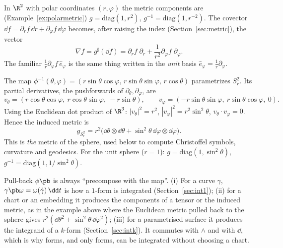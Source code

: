 \begin{example}
In $\R^2$ with polar coordinates $(r,\varphi)$ the metric components are (Example~\ref{ex:polarmetric}) $g=\mathrm{diag}(1,r^2)$, $g^{-1}=\mathrm{diag}(1,r^{-2})$. The covector $\dd f=\partial_rf\,\dd r+\partial_\varphi f\,\dd\varphi$ becomes, after raising the index (Section~\ref{sec:metric}), the vector
\[
\nabla f=g^\sharp(\dd f)=\partial_rf\;\partial_r+\frac{1}{r^2}\partial_\varphi f\;\partial_\varphi .
\]
The familiar $\frac1r\partial_\varphi f\,\hat e_\varphi$ is the same thing written in the \emph{unit} basis $\hat e_\varphi=\frac1r\partial_\varphi$.
\end{example}

\begin{example}
The map $\phi^{-1}(\theta,\varphi)=(r\sin\theta\cos\varphi,\,r\sin\theta\sin\varphi,\,r\cos\theta)$ parametrizes $S^2_r$. Its partial derivatives, \ie the pushforwards of $\partial_\theta,\partial_\varphi$, are
\[
v_\theta=(r\cos\theta\cos\varphi,\ r\cos\theta\sin\varphi,\ -r\sin\theta),\qquad
v_\varphi=(-r\sin\theta\sin\varphi,\ r\sin\theta\cos\varphi,\ 0).
\]
Using the Euclidean dot product of $\R^3$: $|v_\theta|^2=r^2$, $|v_\varphi|^2=r^2\sin^2\theta$, $v_\theta\cdot v_\varphi=0$. Hence the induced metric is
\[
g_{S^2_r}=r^2\big(\dd\theta\otimes\dd\theta+\sin^2\theta\,\dd\varphi\otimes\dd\varphi\big).
\]
This is \emph{the} metric of the sphere, used below to compute Christoffel symbols, curvature and geodesics. For the unit sphere ($r=1$): $g=\mathrm{diag}(1,\sin^2\theta)$, $g^{-1}=\mathrm{diag}(1,1/\sin^2\theta)$.
\end{example}


\begin{synthesis}
Pull-back $\phi\pb$ is always ``precompose with the map''. (i) For a curve $\gamma$, $\gamma\pb\omega=\omega(\dot\gamma)\,\dd t$ is how a $1$-form is integrated (Section~\ref{sec:int1}); (ii) for a
chart or an embedding it produces the components of a tensor or the induced metric, as in the example above where the Euclidean metric pulled back to the sphere gives $r^2(\dd\theta^2+\sin^2\theta\,\dd\varphi^2)$; (iii) for a parametrised surface
it produces the integrand of a $k$-form (Section~\ref{sec:intk}). It commutes with $\wedge$ and with $\dd$, which is why forms, and only forms, can be integrated without choosing a chart.
\end{synthesis}
